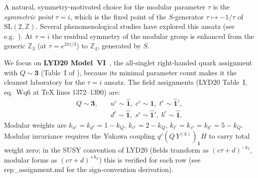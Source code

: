 \documentclass[a4paper,11pt]{article}
\begin{document}
A natural, symmetry-motivated choice for the modular parameter $\tau$
is the \emph{symmetric point} $\tau = i$, which is the fixed point of
the $S$-generator $\tau\mapsto -1/\tau$ of
$\mathrm{SL}(2,\mathbb{Z})$.  Several phenomenological studies have
explored this ansatz (see e.g.~\cite{dMVP26,DuWang22,AbbasKhalil22}).
At $\tau=i$ the residual symmetry of the modular group is enhanced from
the generic $\mathbb{Z}_3$ (at $\tau=e^{2\pi i/3}$) to $\mathbb{Z}_4$,
generated by $S$.

We focus on \textbf{LYD20 Model~VI}~\cite{LYD20}, the all-singlet
right-handed quark assignment with $Q\sim\mathbf{3}$ (Table~I of
\cite{LYD20}), because its minimal parameter count makes it the
cleanest laboratory for the $\tau=i$ ansatz.  The field assignments
(LYD20 Table~I, eq.~Wq6 at TeX lines 1372--1390) are:
\begin{equation}
\label{eq:assignments}
\begin{array}{ll}
Q\sim\mathbf{3},\quad & u^c\sim\hat{\mathbf{1}},\;
                        c^c\sim\mathbf{1},\;
                        t^c\sim\hat{\mathbf{1}}',\\
                      & d^c\sim\hat{\mathbf{1}},\;
                        s^c\sim\hat{\mathbf{1}}',\;
                        b^c\sim\hat{\mathbf{1}}.
\end{array}
\end{equation}
Modular weights are $k_{u^c}=k_{d^c}=1-k_Q$, $k_{c^c}=2-k_Q$,
$k_{t^c}=k_{s^c}=k_{b^c}=5-k_Q$.  Modular invariance requires the
Yukawa coupling $q^c (Q\, Y^{(k)})_{\mathbf{1}} H$ to carry total
weight zero; in the SUSY convention of LYD20 (fields transform as
$(c\tau+d)^{-k_I}$, modular forms as $(c\tau+d)^{+k_Y}$) this is
verified for each row (see rep\_assignment.md for the sign-convention
derivation).
\end{document}

